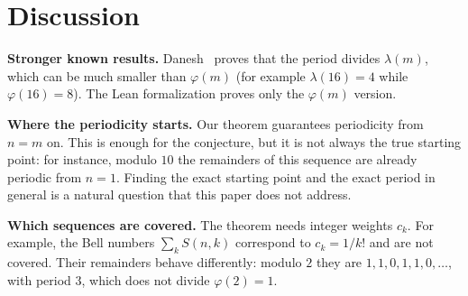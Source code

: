 \documentclass[11pt,a4paper]{article}
\theoremstyle{definition}
\theoremstyle{remark}
\newcommand{\para}[1]{\par\medskip\noindent\textbf{#1}\enspace}
\begin{document}
\section{Discussion}\label{sec:discussion}

\para{Stronger known results.} Danesh~\cite{danesh} proves that the period divides $\lambda(m)$, which can be much smaller
than $\varphi(m)$ (for example $\lambda(16)=4$ while $\varphi(16)=8$). The Lean formalization proves only the
$\varphi(m)$ version.

\para{Where the periodicity starts.} Our theorem guarantees periodicity from $n=m$ on. This is enough for the conjecture,
but it is not always the true starting point: for instance, modulo $10$ the remainders of this sequence are already periodic from $n=1$. Finding the exact starting point and the
exact period in general is a natural question that this paper does not address.

\para{Which sequences are covered.} The theorem needs integer weights $c_k$. For example, the Bell numbers
$\sum_kS(n,k)$ correspond to $c_k=1/k!$ and are not covered. Their remainders behave differently: modulo $2$ they are
$1,1,0,1,1,0,\dots$, with period $3$, which does not divide $\varphi(2)=1$.
\end{document}
